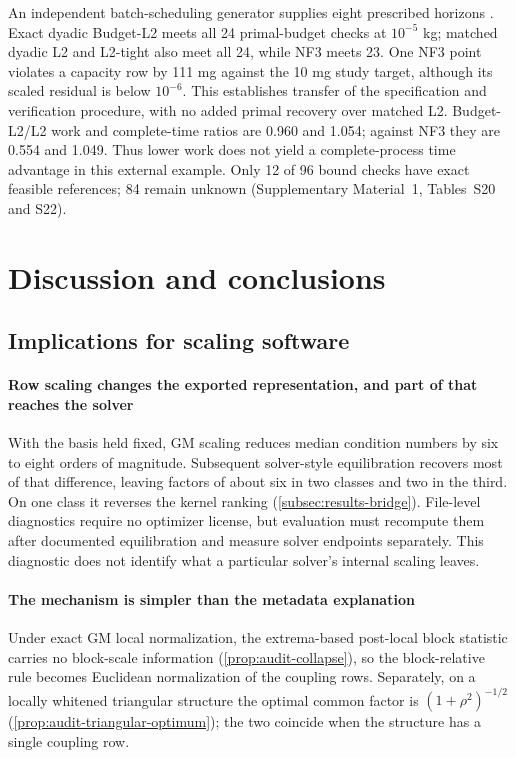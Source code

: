 \documentclass[11pt]{article}
\theoremstyle{definition}
\theoremstyle{remark}
\begin{document}
An independent batch-scheduling generator supplies eight prescribed horizons
\cite{kantorSTN}. Exact dyadic Budget-L2 meets all 24 primal-budget checks at
$10^{-5}$ kg; matched dyadic L2 and L2-tight also meet all 24, while NF3 meets
23. One NF3 point violates a capacity row by 111 mg against the 10 mg study
target, although its scaled residual is below $10^{-6}$. This establishes
transfer of the specification and verification procedure, with no added primal
recovery over matched L2. Budget-L2/L2 work and complete-time ratios are 0.960
and 1.054; against NF3 they are 0.554 and 1.049. Thus lower work does not yield
a complete-process time advantage in this external example. Only 12 of 96
bound checks have exact feasible references; 84 remain unknown
(Supplementary Material~1, Tables~S20 and S22).

\section{Discussion and conclusions}
\label{sec:discussion}
\subsection{Implications for scaling software}
\paragraph{Row scaling changes the exported representation, and part of that reaches the
solver} With the basis held fixed, GM scaling reduces median condition numbers
by six to eight orders of magnitude. Subsequent solver-style equilibration recovers
most of that difference, leaving factors of about six in two classes and two in the
third. On one class it reverses the kernel ranking
(\cref{subsec:results-bridge}). File-level diagnostics require no optimizer license,
but evaluation must recompute them after documented equilibration and measure solver
endpoints separately. This diagnostic does not identify what a particular solver's
internal scaling leaves.

\paragraph{The mechanism is simpler than the metadata explanation} Under exact GM local
normalization, the extrema-based post-local block statistic carries no block-scale information
(\cref{prop:audit-collapse}), so the block-relative rule becomes Euclidean normalization of the
coupling rows. Separately, on a locally whitened triangular structure the optimal common factor
is $(1+\rho^2)^{-1/2}$ (\cref{prop:audit-triangular-optimum}); the two coincide when the
structure has a single coupling row.
\end{document}
